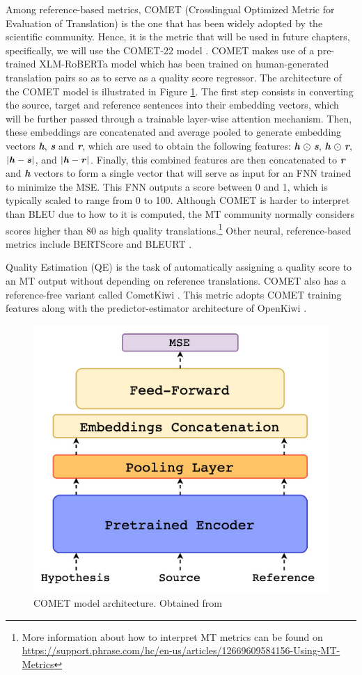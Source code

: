 \documentclass[11pt,english,listoffigures,listoftables]{tfgetsinf}
\begin{document}
Among reference-based metrics, COMET (Crosslingual Optimized Metric for Evaluation of Translation) \cite{rei2020comet} is the one that has been widely adopted by the scientific community. Hence, it is the metric that will be used in future chapters, specifically, we will use the COMET-22 model \cite{rei-etal-2022-comet}. COMET makes use of a pre-trained XLM-RoBERTa model \cite{conneau2019xlm-r} which has been trained on human-generated translation pairs so as to serve as a quality score regressor. The architecture of the COMET model is illustrated in Figure \ref{fig:comet}. The first step consists in converting the source, target and reference sentences into their embedding vectors, which will be further passed through a trainable layer-wise attention mechanism. Then, these embeddings are concatenated and average pooled to generate embedding vectors \textbf{\textit{h}}, \textbf{\textit{s}} and \textbf{\textit{r}}, which are used to obtain the following features: \textbf{\textit{h}} $\odot$ \textbf{\textit{s}}, \textbf{\textit{h}} $\odot$ \textbf{\textit{r}}, $ |\textbf{\textit{h}} - \textbf{\textit{s}}| $, and $ |\textbf{\textit{h}} - \textbf{\textit{r}}| $. Finally, this combined features are then concatenated to \textbf{\textit{r}} and \textbf{\textit{h}} vectors to form a single vector that will serve as input for an FNN trained to minimize the MSE. This FNN outputs a score between 0 and 1, which is typically scaled to range from 0 to 100. Although COMET is harder to interpret than BLEU due to how to it is computed, the MT community normally considers scores higher than 80 as high quality translations.\footnote{More information about how to interpret MT metrics can be found on \url{https://support.phrase.com/hc/en-us/articles/12669609584156-Using-MT-Metrics}}
Other neural, reference-based metrics include BERTScore \cite{zhang2019bertscore} and BLEURT \cite{sellam-etal-2020-bleurt}.

Quality Estimation (QE) is the task of automatically assigning a quality score to an MT output without depending on reference translations. COMET also has a reference-free variant called CometKiwi \cite{rei2022cometkiwi}. This metric adopts COMET training features along with the predictor-estimator architecture of OpenKiwi \cite{kepler-etal-2019-openkiwi}.

\begin{figure}[h]
    \centering
    \includegraphics[width=0.55\linewidth]{comet_arch.png}
    \caption{COMET model architecture. Obtained from \cite{rei2020comet}}
    \label{fig:comet}
\end{figure}
\end{document}
